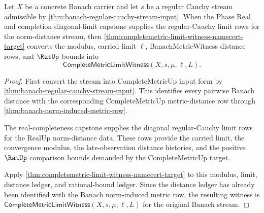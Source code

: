\begin{theorem}
\label{thm:banach-real-completeness-limit-consumption}
Let $X$ be a concrete Banach carrier and let $s$ be a regular Cauchy stream
admissible by \autoref{thm:banach-regular-cauchy-stream-input}. When the Phase
Real and completion diagonal-limit capstone supplies the regular-Cauchy limit
rows for the norm-distance stream, then
\autoref{thm:completemetric-limit-witness-namecert-target} converts the
modulus, carried limit $\ell$, BanachMetricWitness distance rows, and $\RatUp$
bounds into
$$
\mathsf{CompleteMetricLimitWitness}(X,s,\mu,\ell,L).
$$
\end{theorem}
\begin{proof}
First convert the stream into CompleteMetricUp input form by
\autoref{thm:banach-regular-cauchy-stream-input}. This identifies every
pairwise Banach distance with the corresponding CompleteMetricUp
metric-distance row through
\autoref{thm:banach-norm-induced-metric-row}.

The real-completeness capstone supplies the diagonal regular-Cauchy limit
rows for the RealUp norm-distance data. These rows provide the carried limit,
the convergence modulus, the late-observation distance histories, and the
positive $\RatUp$ comparison bounds demanded by the CompleteMetricUp target.

Apply \autoref{thm:completemetric-limit-witness-namecert-target} to this
modulus, limit, distance ledger, and rational-bound ledger. Since the
distance ledger has already been identified with the Banach norm-induced
metric row, the resulting witness is
$\mathsf{CompleteMetricLimitWitness}(X,s,\mu,\ell,L)$ for the original
Banach stream.
\end{proof}

